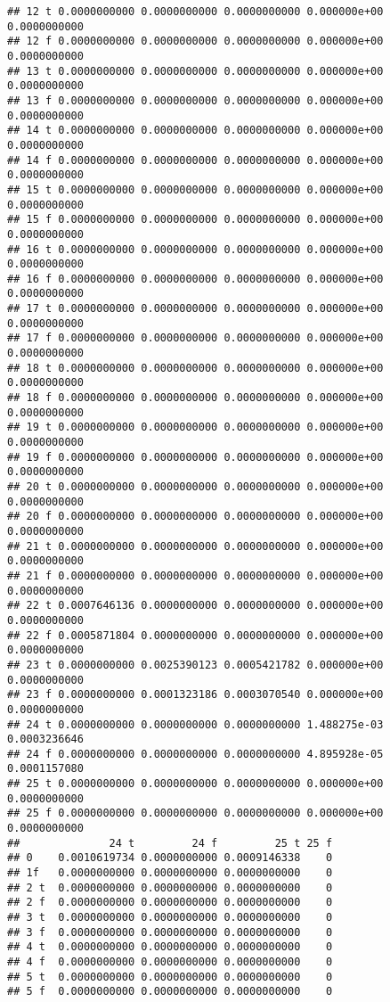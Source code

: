 \documentclass[]{article}
\begin{document}
\begin{verbatim}
## 12 t 0.0000000000 0.0000000000 0.0000000000 0.000000e+00 0.0000000000
## 12 f 0.0000000000 0.0000000000 0.0000000000 0.000000e+00 0.0000000000
## 13 t 0.0000000000 0.0000000000 0.0000000000 0.000000e+00 0.0000000000
## 13 f 0.0000000000 0.0000000000 0.0000000000 0.000000e+00 0.0000000000
## 14 t 0.0000000000 0.0000000000 0.0000000000 0.000000e+00 0.0000000000
## 14 f 0.0000000000 0.0000000000 0.0000000000 0.000000e+00 0.0000000000
## 15 t 0.0000000000 0.0000000000 0.0000000000 0.000000e+00 0.0000000000
## 15 f 0.0000000000 0.0000000000 0.0000000000 0.000000e+00 0.0000000000
## 16 t 0.0000000000 0.0000000000 0.0000000000 0.000000e+00 0.0000000000
## 16 f 0.0000000000 0.0000000000 0.0000000000 0.000000e+00 0.0000000000
## 17 t 0.0000000000 0.0000000000 0.0000000000 0.000000e+00 0.0000000000
## 17 f 0.0000000000 0.0000000000 0.0000000000 0.000000e+00 0.0000000000
## 18 t 0.0000000000 0.0000000000 0.0000000000 0.000000e+00 0.0000000000
## 18 f 0.0000000000 0.0000000000 0.0000000000 0.000000e+00 0.0000000000
## 19 t 0.0000000000 0.0000000000 0.0000000000 0.000000e+00 0.0000000000
## 19 f 0.0000000000 0.0000000000 0.0000000000 0.000000e+00 0.0000000000
## 20 t 0.0000000000 0.0000000000 0.0000000000 0.000000e+00 0.0000000000
## 20 f 0.0000000000 0.0000000000 0.0000000000 0.000000e+00 0.0000000000
## 21 t 0.0000000000 0.0000000000 0.0000000000 0.000000e+00 0.0000000000
## 21 f 0.0000000000 0.0000000000 0.0000000000 0.000000e+00 0.0000000000
## 22 t 0.0007646136 0.0000000000 0.0000000000 0.000000e+00 0.0000000000
## 22 f 0.0005871804 0.0000000000 0.0000000000 0.000000e+00 0.0000000000
## 23 t 0.0000000000 0.0025390123 0.0005421782 0.000000e+00 0.0000000000
## 23 f 0.0000000000 0.0001323186 0.0003070540 0.000000e+00 0.0000000000
## 24 t 0.0000000000 0.0000000000 0.0000000000 1.488275e-03 0.0003236646
## 24 f 0.0000000000 0.0000000000 0.0000000000 4.895928e-05 0.0001157080
## 25 t 0.0000000000 0.0000000000 0.0000000000 0.000000e+00 0.0000000000
## 25 f 0.0000000000 0.0000000000 0.0000000000 0.000000e+00 0.0000000000
##              24 t         24 f         25 t 25 f
## 0    0.0010619734 0.0000000000 0.0009146338    0
## 1f   0.0000000000 0.0000000000 0.0000000000    0
## 2 t  0.0000000000 0.0000000000 0.0000000000    0
## 2 f  0.0000000000 0.0000000000 0.0000000000    0
## 3 t  0.0000000000 0.0000000000 0.0000000000    0
## 3 f  0.0000000000 0.0000000000 0.0000000000    0
## 4 t  0.0000000000 0.0000000000 0.0000000000    0
## 4 f  0.0000000000 0.0000000000 0.0000000000    0
## 5 t  0.0000000000 0.0000000000 0.0000000000    0
## 5 f  0.0000000000 0.0000000000 0.0000000000    0

\end{verbatim}
\end{document}
